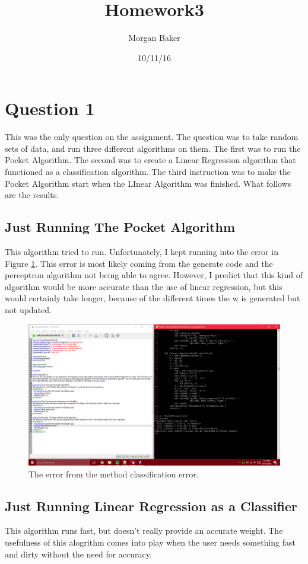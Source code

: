 \documentclass[a4paper]{article}
\title{Homework3}
\author{Morgan Baker}
\date{10/11/16}
\begin{document}
\lstset{language=Python}

\maketitle

\section{Question 1}
This was the only question on the assignment. The question was to take random sets of data, and run three different algorithms on them. The first was to run the Pocket Algorithm. The second was to create a Linear Regression algorithm that functioned as a classification algorithm. The third instruction was to make the Pocket Algorithm start when the LInear Algorithm was finished. What follows are the results.

\subsection{Just Running The Pocket Algorithm}
This algorithm tried to run. Unfortunately, I kept running into the error in Figure \ref{fig:Figure1}. This error is most likely coming from the generate code and the perceptron algorithm not being able to agree. However, I predict that this kind of algorithm would be more accurate than the use of linear regression, but this would certainly take longer, because of the different times the w is generated but not updated. 
\begin{figure}
  \includegraphics[width=\linewidth]{broken.png}
  \caption{The error from the method classification error.}
  \label{fig:Figure1}
\end{figure}

\subsection{Just Running Linear Regression as a Classifier}
This algorithm runs fast, but doesn't really provide an accurate weight. The usefulness of this alogrithm comes into play when the user needs something fast and dirty without the need for accuracy.
\end{document}
